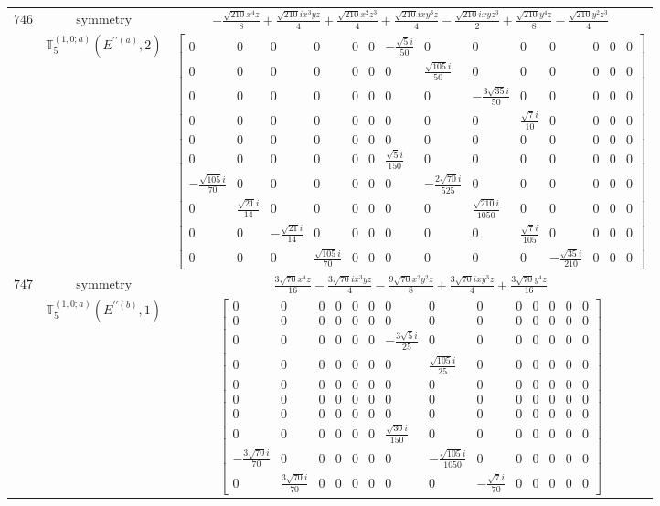 \documentclass[fleqn,8pt,landscape]{jsarticle}
\begin{document}
\begin{longtable}{ccc}
$ 746 $ & $ \text{symmetry} $ & $ - \frac{\sqrt{210} x^{4} z}{8} + \frac{\sqrt{210} i x^{3} y z}{4} + \frac{\sqrt{210} x^{2} z^{3}}{4} + \frac{\sqrt{210} i x y^{3} z}{4} - \frac{\sqrt{210} i x y z^{3}}{2} + \frac{\sqrt{210} y^{4} z}{8} - \frac{\sqrt{210} y^{2} z^{3}}{4} $ \\
$  $ & $ \mathbb{T}_{5}^{(1,0;a)}(E^{\prime\prime(a)},2) $ & $ \begin{bmatrix} 0 & 0 & 0 & 0 & 0 & 0 & - \frac{\sqrt{5} i}{50} & 0 & 0 & 0 & 0 & 0 & 0 & 0 \\ 0 & 0 & 0 & 0 & 0 & 0 & 0 & \frac{\sqrt{105} i}{50} & 0 & 0 & 0 & 0 & 0 & 0 \\ 0 & 0 & 0 & 0 & 0 & 0 & 0 & 0 & - \frac{3 \sqrt{35} i}{50} & 0 & 0 & 0 & 0 & 0 \\ 0 & 0 & 0 & 0 & 0 & 0 & 0 & 0 & 0 & \frac{\sqrt{7} i}{10} & 0 & 0 & 0 & 0 \\ 0 & 0 & 0 & 0 & 0 & 0 & 0 & 0 & 0 & 0 & 0 & 0 & 0 & 0 \\ 0 & 0 & 0 & 0 & 0 & 0 & \frac{\sqrt{5} i}{150} & 0 & 0 & 0 & 0 & 0 & 0 & 0 \\ - \frac{\sqrt{105} i}{70} & 0 & 0 & 0 & 0 & 0 & 0 & - \frac{2 \sqrt{70} i}{525} & 0 & 0 & 0 & 0 & 0 & 0 \\ 0 & \frac{\sqrt{21} i}{14} & 0 & 0 & 0 & 0 & 0 & 0 & \frac{\sqrt{210} i}{1050} & 0 & 0 & 0 & 0 & 0 \\ 0 & 0 & - \frac{\sqrt{21} i}{14} & 0 & 0 & 0 & 0 & 0 & 0 & \frac{\sqrt{7} i}{105} & 0 & 0 & 0 & 0 \\ 0 & 0 & 0 & \frac{\sqrt{105} i}{70} & 0 & 0 & 0 & 0 & 0 & 0 & - \frac{\sqrt{35} i}{210} & 0 & 0 & 0 \end{bmatrix} $ \\ \hline
$ 747 $ & $ \text{symmetry} $ & $ \frac{3 \sqrt{70} x^{4} z}{16} - \frac{3 \sqrt{70} i x^{3} y z}{4} - \frac{9 \sqrt{70} x^{2} y^{2} z}{8} + \frac{3 \sqrt{70} i x y^{3} z}{4} + \frac{3 \sqrt{70} y^{4} z}{16} $ \\
$  $ & $ \mathbb{T}_{5}^{(1,0;a)}(E^{\prime\prime(b)},1) $ & $ \begin{bmatrix} 0 & 0 & 0 & 0 & 0 & 0 & 0 & 0 & 0 & 0 & 0 & 0 & 0 & 0 \\ 0 & 0 & 0 & 0 & 0 & 0 & 0 & 0 & 0 & 0 & 0 & 0 & 0 & 0 \\ 0 & 0 & 0 & 0 & 0 & 0 & - \frac{3 \sqrt{5} i}{25} & 0 & 0 & 0 & 0 & 0 & 0 & 0 \\ 0 & 0 & 0 & 0 & 0 & 0 & 0 & \frac{\sqrt{105} i}{25} & 0 & 0 & 0 & 0 & 0 & 0 \\ 0 & 0 & 0 & 0 & 0 & 0 & 0 & 0 & 0 & 0 & 0 & 0 & 0 & 0 \\ 0 & 0 & 0 & 0 & 0 & 0 & 0 & 0 & 0 & 0 & 0 & 0 & 0 & 0 \\ 0 & 0 & 0 & 0 & 0 & 0 & 0 & 0 & 0 & 0 & 0 & 0 & 0 & 0 \\ 0 & 0 & 0 & 0 & 0 & 0 & \frac{\sqrt{30} i}{150} & 0 & 0 & 0 & 0 & 0 & 0 & 0 \\ - \frac{3 \sqrt{70} i}{70} & 0 & 0 & 0 & 0 & 0 & 0 & - \frac{\sqrt{105} i}{1050} & 0 & 0 & 0 & 0 & 0 & 0 \\ 0 & \frac{3 \sqrt{70} i}{70} & 0 & 0 & 0 & 0 & 0 & 0 & - \frac{\sqrt{7} i}{70} & 0 & 0 & 0 & 0 & 0 \end{bmatrix} $ \\ \hline

\end{longtable}
\end{document}
